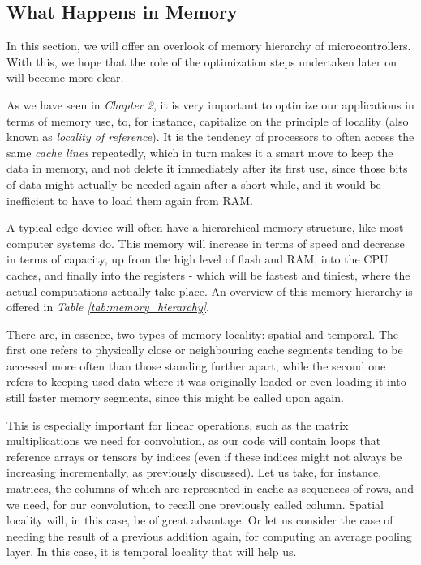 \subsection{What Happens in Memory}
In this section, we will offer an overlook of memory hierarchy of microcontrollers. With this, we hope that the role of the optimization steps undertaken later on will become more clear. \par
As we have seen in \textit{Chapter 2}, it is very important to optimize our applications in terms of memory use, to, for instance, capitalize on the principle of locality (also known as \textit{locality of reference}). \cite{memory_local} It is the tendency of processors to often access the same \textit{cache lines} repeatedly, which in turn makes it a smart move to keep the data in memory, and not delete it immediately after its first use, since those bits of data might actually be needed again after a short while, and it would be inefficient to have to load them again from RAM. \par
A typical edge device will often have a hierarchical memory structure, like most computer systems do. This memory will increase in terms of speed and decrease in terms of capacity, up from the high level of flash and RAM, into the CPU caches, and finally into the registers - which will be fastest and tiniest, where the actual computations actually take place. An overview of this memory hierarchy is offered in \textit{Table \ref{tab:memory_hierarchy}}. \par
There are, in essence, two types of memory locality: spatial and temporal. The first one refers to physically close or neighbouring cache segments tending to be accessed more often than those standing further apart, while the second one refers to keeping used data where it was originally loaded or even loading it into still faster memory segments, since this might be called upon again. \cite{computer_org_anddesign} \par
This is especially important for linear operations, such as the matrix multiplications we need for convolution, as our code will contain loops that reference arrays or tensors by indices (even if these indices might not always be increasing incrementally, as previously discussed). Let us take, for instance, matrices, the columns of which are represented in cache as sequences of rows, and we need, for our convolution, to recall one previously called column. Spatial locality will, in this case, be of great advantage. Or let us consider the case of needing the result of a previous addition again, for computing an average pooling layer. In this case, it is temporal locality that will help us.

